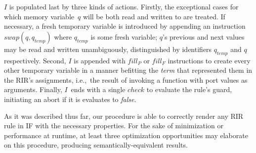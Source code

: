 $I$ is populated last by three kinds of actions. Firstly, the exceptional cases for which memory variable~$q$ will be both read and written to are treated. If necessary, a fresh temporary variable is introduced by appending an instruction $swap(q, q_{temp})$ where $q_{temp}$ is some fresh variable; $q$'s previous and next values may be read and written unambiguously, distinguished by identifiers $q_{temp}$ and $q$ respectively. Second, $I$ is appended with $fill_P$ or $fill_F$ instructions to create every other temporary variable in a manner befitting the \textit{term} that represented them in the RIR's assignments, i.e.,\ the result of invoking a function with port values as arguments. Finally, $I$~ends with a single $check$ to evaluate the rule's guard, initiating an abort if it is evaluates to \textit{false}.

As it was described thus far, our procedure is able to correctly render any RIR rule in IF with the necessary properties. For the sake of minimization or performance at runtime, at least three optimization opportunities may elaborate on this procedure, producing semantically-equivalent results.


